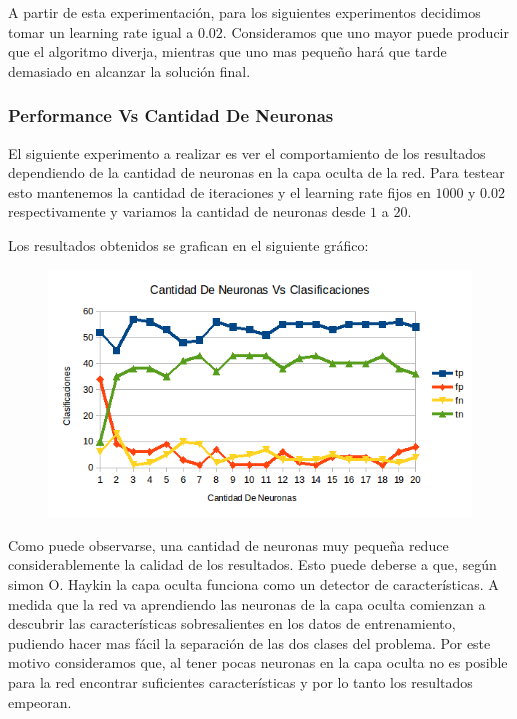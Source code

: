 A partir de esta experimentación, para los siguientes experimentos decidimos tomar un learning rate igual a $0.02$. Consideramos que uno mayor puede producir que el algoritmo diverja, mientras que uno mas pequeño hará que tarde demasiado en alcanzar la solución final.

\subsubsection{Performance Vs Cantidad De Neuronas} 

El siguiente experimento a realizar es ver el comportamiento de los resultados dependiendo de la cantidad de neuronas en la capa oculta de la red. Para testear esto mantenemos la cantidad de iteraciones y el learning rate fijos en $1000$ y $0.02$ respectivamente y variamos la cantidad de neuronas desde $1$ a $20$.

Los resultados obtenidos se grafican en el siguiente gráfico:

\begin{figure}[h!]
\centering
\includegraphics[scale=0.4]{ej1/test_neuronas.png}
\end{figure}

Como puede observarse, una cantidad de neuronas muy pequeña reduce considerablemente la calidad de los resultados. Esto puede deberse a que, según simon O. Haykin la capa oculta funciona como un detector de características. A medida que la red va aprendiendo las neuronas de la capa oculta comienzan a descubrir las características sobresalientes en los datos de entrenamiento, pudiendo hacer mas fácil la separación de las dos clases del problema. Por este motivo consideramos que, al tener pocas neuronas en la capa oculta no es posible para la red encontrar suficientes características y por lo tanto los resultados empeoran.

